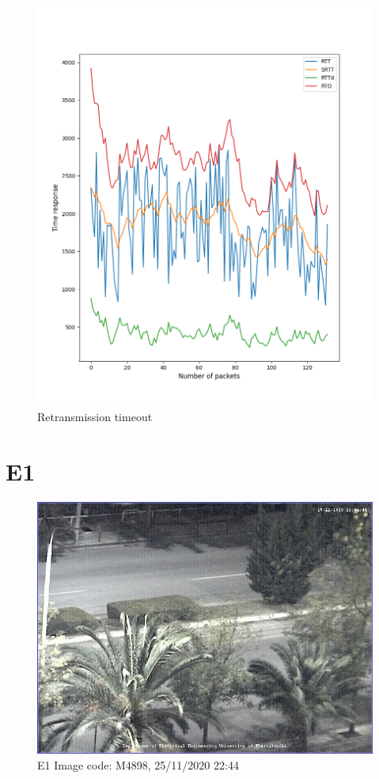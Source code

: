\documentclass[hidelinks, 12pt, a4paper]{article}
\begin{document}
\begin{figure}[h!]
\centering
	\includegraphics[height=.4\textheight, width=\textwidth]{assets/session1/r1.png}
	\caption{Retransmission timeout} 
\end{figure}

\section{E1}

\begin{figure}[h!]
\centering
	\includegraphics[height=.4\textheight, width=\textwidth]{assets/session1/image_fix.jpg}
	\caption{E1 Image code: M4898, 25/11/2020 22:44} 
\end{figure}
\end{document}
